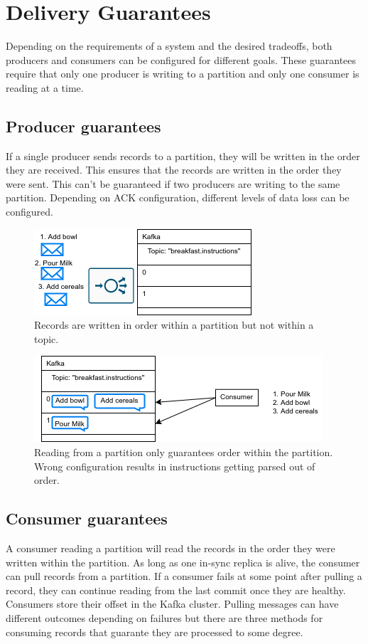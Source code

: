\documentclass[11pt]{article}
\begin{document}
\section{Delivery Guarantees}
Depending on the requirements of a system and the desired tradeoffs, both producers and consumers can be configured for different goals. These guarantees require that only one producer is writing to a partition and only one consumer is reading at a time.

\subsection{Producer guarantees}

If a single producer sends records to a partition, they will be written in the order they are received. This ensures that the records are written in the order they were sent. This can't be guaranteed if two producers are writing to the same partition. Depending on ACK configuration, different levels of data loss can be configured.

\begin{figure}[htbp]
\centerline{\includegraphics[scale=0.8]{assets/write.png}}
\caption{Records are written in order within a partition but not within a topic.}
\label{fig}
\end{figure}

\begin{figure}[htbp]
\centerline{\includegraphics[scale=0.8]{assets/read.png}}
\caption{Reading from a partition only guarantees order within the partition. Wrong configuration results in instructions getting parsed out of order.}
\label{fig}
\end{figure}

\subsection{Consumer guarantees}
A consumer reading a partition will read the records in the order they were written within the partition.
As long as one in-sync replica is alive, the consumer can pull records from a partition. If a consumer fails at some point after pulling a record, they can continue reading from the last commit once they are healthy. Consumers store their offset in the Kafka cluster.
\newline
\newline
Pulling messages can have different outcomes depending on failures but there are three methods for consuming records that guarante they are processed to some degree.
\end{document}
